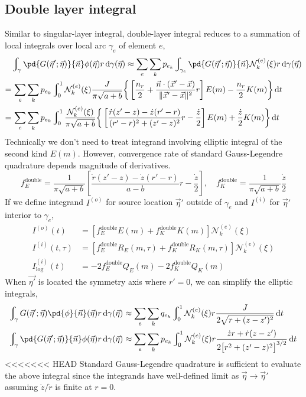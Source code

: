 \documentclass{jfm}
\begin{document}
\subsection{Double layer integral}
Similar to singular-layer integral, double-layer integral reduces to a summation of local integrals over local arc $\gamma_e$ of element $e$,
\begin{align}
&\nonumber\int_{\gamma}\pd{G(\vec{\eta}';\vec{\eta})}{\vec{n}}\phi(\vec{\eta}) r \,\mathrm{d}\gamma(\vec{\eta})
\approx\sum_e \sum_k p_{e_k}
\int_{\gamma_e}\pd{G(\vec{\eta}';\vec{\eta})}{\vec{n}}\mathcal{N}^{(e)}_k(\xi) r \,\mathrm{d}\gamma(\vec{\eta})\\
=&\nonumber\,\sum_e \sum_k p_{e_k}
\int_0^1\mathcal{N}^{(e)}_k(\xi)
\frac{J}{\pi \sqrt{a+b}}\bigg\{
\left[\frac{n_r}{2}+\frac{\vec{n}\cdot(\vec{x}'-\vec{x})}{\|\vec{x}'-\vec{x}\|^2}r\right]E(m)
-\frac{n_r}{2}K(m)\bigg\}
\,\mathrm{d}t\\
=&\,\sum_e \sum_k p_{e_k}
\int_0^1
\frac{\mathcal{N}^{(e)}_k(\xi)}{\pi \sqrt{a+b}}\bigg\{
\left[\frac{\dot{r}(z'-z)-\dot{z}(r'-r)}{(r'-r)^2+(z'-z)^2}r
-\frac{\dot{z}}{2}\right]E(m)
+\frac{\dot{z}}{2}K(m)\bigg\}
\,\mathrm{d}t
\end{align}
Technically we don't need to treat integrand involving elliptic integral of the second kind $E(m)$.
However, convergence rate of standard Gauss-Legendre quadrature  depends magnitude of derivatives.
\begin{equation}
f_E^\mathrm{double}=\frac{1}{\pi \sqrt{a+b}}
\left[\frac{\dot{r}(z'-z)-\dot{z}(r'-r)}{a-b}r
-\frac{\dot{z}}{2}\right],\quad
f_K^\mathrm{double}=\frac{1}{\pi \sqrt{a+b}}
\frac{\dot{z}}{2}
\end{equation}
If we define integrand $I^{(o)}$ for source location $\vec{\eta}'$ outside of $\gamma_e$
and $I^{(i)}$ for $\vec{\eta}'$ interior to $\gamma_e$,
\begin{align}
I^{(o)}(t) &= \left[ f_E^\mathrm{double} E(m)+f_K^\mathrm{double} K(m)\right]\mathcal{N}^{(e)}_k(\xi)\\
I^{(i)}(t,\tau) &= \left[f_E^\mathrm{double}R_E(m,\tau)+ f_K^\mathrm{double}R_K(m,\tau)\right]\mathcal{N}^{(e)}_k(\xi)\\
I^{(i)}_\mathrm{log}(t) &=-2 f_E^\mathrm{double}Q_E(m) -2 f_K^\mathrm{double}Q_K(m) 
\end{align}
When $\vec{\eta'}$ is located the symmetry axis where $r'=0$,
we can simplify the elliptic integrals,
\begin{align}
\int_{\gamma}G(\vec{\eta}';\vec{\eta})
\pd{\phi}{\vec{n}}(\vec{\eta}) r \,\mathrm{d}\gamma(\vec{\eta})
&\approx\sum_e \sum_k q_{e_k}
\int_0^1\mathcal{N}^{(e)}_k(\xi)r\frac{   J }{
2 \sqrt{r+(z-z')^2}}\,\mathrm{d}t\\
\int_{\gamma}\pd{G(\vec{\eta}';\vec{\eta})}{\vec{n}}\phi(\vec{\eta}) r \,\mathrm{d}\gamma(\vec{\eta})
&\approx\sum_e \sum_k p_{e_k}
\int_0^1\mathcal{N}^{(e)}_k(\xi)r \frac{  
\dot{z}r+\dot{r}(z-z')
}{
2\big[r^2+(z'-z)^2\big]^{3/2}
}\,\mathrm{d}t
\end{align}
<<<<<<< HEAD
Standard Gauss-Legendre quadrature is sufficient
to evaluate the above integral since
the integrands have well-defined limit as $\vec{\eta}\to\vec{\eta}'$
assuming $\ddot{z}/\dot{r}$ is finite at $r=0$.
\end{document}
